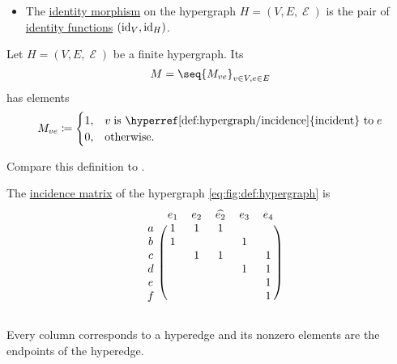 \begin{definition}
\begin{itemize}
    \item The \hyperref[def:category/identity]{identity morphism} on the hypergraph \( H = (V, E, \mscrE) \) is the pair of \hyperref[def:multi_valued_function/identity]{identity functions} \( (\operatorname{id}_V, \operatorname{id}_H) \).
  \end{itemize}
\end{definition}

\begin{definition}\label{def:hypergraph_incidence_matrix}
  Let \( H = (V, E, \mscrE) \) be a finite hypergraph. Its 
  \begin{equation*}
    M = \seq{ M_{ve} }_{v \in V, e \in E}
  \end{equation*}
  has elements
  \begin{equation*}
    M_{ve} \coloneqq \begin{cases}
      1,  &v \T{is \hyperref[def:hypergraph/incidence]{incident} to} e \\
      0,  &\T{otherwise.}
    \end{cases}
  \end{equation*}

  Compare this definition to .
\end{definition}

\begin{example}\label{ex:def:hypergraph_incidence_matrix}
  The \hyperref[def:hypergraph_incidence_matrix]{incidence matrix} of the hypergraph \eqref{eq:fig:def:hypergraph} is
  \begin{equation}\label{eq:ex:def:hypergraph_incidence_matrix}
    \begin{blockarray}{cccccc}
        & e_1 & e_2 & \widehat{e_2} & e_3 & e_4 \\
      \begin{block}{c(ccccc)}
      a & 1   & 1   & 1             &     &     \\
      b & 1   &     &               & 1   &     \\
      c &     & 1   & 1             &     & 1   \\
      d &     &     &               & 1   & 1   \\
      e &     &     &               &     & 1   \\
      f &     &     &               &     & 1   \\
      \end{block}
    \end{blockarray}
  \end{equation}

  Every column corresponds to a hyperedge and its nonzero elements are the endpoints of the hyperedge.
\end{example}

